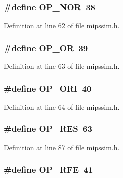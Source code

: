 \subsubsection[{O\+P\+\_\+\+N\+OR}]{\setlength{\rightskip}{0pt plus 5cm}\#define O\+P\+\_\+\+N\+OR~38}\label{mipssim_8h_a31cc88c199e989fc13f8ca64dd0a6a40}


Definition at line 62 of file mipssim.\+h.

\subsubsection[{O\+P\+\_\+\+OR}]{\setlength{\rightskip}{0pt plus 5cm}\#define O\+P\+\_\+\+OR~39}\label{mipssim_8h_ada17ceeb97ff33a840db0943f9821c5b}


Definition at line 63 of file mipssim.\+h.

\subsubsection[{O\+P\+\_\+\+O\+RI}]{\setlength{\rightskip}{0pt plus 5cm}\#define O\+P\+\_\+\+O\+RI~40}\label{mipssim_8h_af92e12c7734e8d1b5eaa67bc1a5aea6a}


Definition at line 64 of file mipssim.\+h.

\subsubsection[{O\+P\+\_\+\+R\+ES}]{\setlength{\rightskip}{0pt plus 5cm}\#define O\+P\+\_\+\+R\+ES~63}\label{mipssim_8h_abf5c3ad7e4734f93c90afacd4a48a2f3}


Definition at line 87 of file mipssim.\+h.

\subsubsection[{O\+P\+\_\+\+R\+FE}]{\setlength{\rightskip}{0pt plus 5cm}\#define O\+P\+\_\+\+R\+FE~41}\label{mipssim_8h_a0f1e7b64788c8e59949b1d76293e965f}


